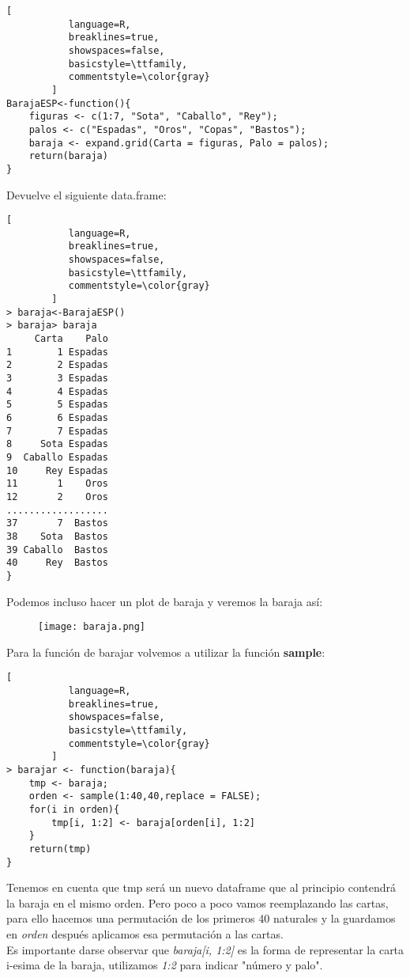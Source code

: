 \documentclass[11pt,fleqn]{book} %
\begin{document}
\begin{lstlisting}[
           language=R,
           breaklines=true,
           showspaces=false,
           basicstyle=\ttfamily,
           commentstyle=\color{gray}
        ]
BarajaESP<-function(){
    figuras <- c(1:7, "Sota", "Caballo", "Rey");
    palos <- c("Espadas", "Oros", "Copas", "Bastos");
    baraja <- expand.grid(Carta = figuras, Palo = palos);
    return(baraja)
}
\end{lstlisting}
Devuelve el siguiente data.frame:
\begin{lstlisting}[
           language=R,
           breaklines=true,
           showspaces=false,
           basicstyle=\ttfamily,
           commentstyle=\color{gray}
        ]
> baraja<-BarajaESP()
> baraja> baraja
     Carta    Palo
1        1 Espadas
2        2 Espadas
3        3 Espadas
4        4 Espadas
5        5 Espadas
6        6 Espadas
7        7 Espadas
8     Sota Espadas
9  Caballo Espadas
10     Rey Espadas
11       1    Oros
12       2    Oros
..................
37       7  Bastos
38    Sota  Bastos
39 Caballo  Bastos
40     Rey  Bastos
}
\end{lstlisting}
Podemos incluso hacer un plot de baraja y veremos la baraja así:

\begin{figure}
\texttt{[image: baraja.png]}

\end{figure}

\pagebreak
Para la función de barajar volvemos a utilizar la función \textbf{sample}:
\begin{lstlisting}[
           language=R,
           breaklines=true,
           showspaces=false,
           basicstyle=\ttfamily,
           commentstyle=\color{gray}
        ]
> barajar <- function(baraja){
    tmp <- baraja;
    orden <- sample(1:40,40,replace = FALSE);
    for(i in orden){
        tmp[i, 1:2] <- baraja[orden[i], 1:2]
    }
    return(tmp)
}
\end{lstlisting}
Tenemos en cuenta que tmp será un nuevo dataframe que al principio contendrá la baraja en el mismo orden.
Pero poco a poco vamos reemplazando las cartas, para ello hacemos una permutación de los primeros 40 naturales y la guardamos en \textit{orden} después aplicamos esa permutación a las cartas.\\
Es importante darse observar que \textit{baraja[i, 1:2]} es la forma de representar la carta i-esima de la baraja, utilizamos \textit{1:2} para indicar "número y palo".
\end{document}
